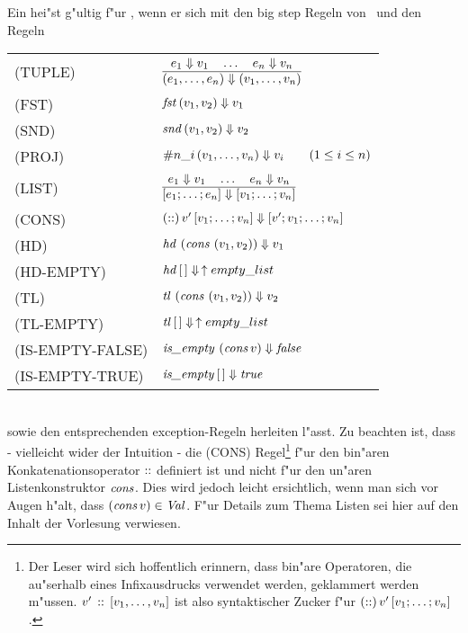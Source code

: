 Ein  hei"st g"ultig f"ur \LTHREE, wenn er sich mit den big step Regeln von \LTWO\ und den Regeln\\[5mm]
  \begin{tabular}{ll}
    \mbox{(TUPLE)}          & $\regel{e_1 \eval v_1 \quad \ldots \quad e_n \eval v_n}
                                     {(e_1,\ldots,e_n) \eval (v_1,\ldots,v_n)}$ \\[5mm]
    \mbox{(FST)}            & ${\text{\it fst\/}}\,(v_1,v_2) \Downarrow v_1$ \\[3mm]
    \mbox{(SND)}            & ${\text{\it snd\/}}\,(v_1,v_2) \Downarrow v_2$ \\[3mm]
    \mbox{(PROJ)}           & $\#n\_i\,(v_1,\ldots,v_n) \Downarrow v_i \qquad (1 \le i \le n)$ \\[3mm]
    \mbox{(LIST)}           & $\regel{e_1 \eval v_1 \quad \ldots \quad e_n \eval v_n}
                                     {[e_1;\ldots;e_n] \eval [v_1;\ldots;v_n]}$ \\[5mm]
    \mbox{(CONS)}           & $(\mathrel{::})\,v'\,[v_1;\ldots;v_n] \Downarrow [v';v_1;\ldots;v_n]$ \\[3mm]
    \mbox{(HD)}             & ${\text{\it hd\/}}\,\left({\text{\it cons\/}}\,\left(v_1,v_2\right)\right) \Downarrow v_1$ \\[3mm]
    \mbox{(HD-EMPTY)}       & ${\text{\it hd\/}}\,[\,] \Downarrow\,\uparrow empty\_list$ \\[3mm]
    \mbox{(TL)}             & ${\text{\it tl\/}}\,\left({\text{\it cons\/}}\,\left(v_1,v_2\right)\right) \Downarrow v_2$ \\[3mm]
    \mbox{(TL-EMPTY)}       & ${\text{\it tl\/}}\,[\,] \Downarrow\,\uparrow empty\_list$ \\[3mm]
    \mbox{(IS-EMPTY-FALSE)} & ${\text{\it is\_empty\/}}\,\left({\text{\it cons\/}}\,v\right) \Downarrow {\text{\it false\/}}$ \\[3mm]
    \mbox{(IS-EMPTY-TRUE)}  & ${\text{\it is\_empty\/}}\,[\,] \Downarrow {\text{\it true\/}}$
  \end{tabular}\\[7mm]
sowie den entsprechenden exception-Regeln herleiten l"asst. Zu beachten ist, dass - vielleicht wider der Intuition - die
(CONS) Regel\footnote{Der Leser wird sich hoffentlich erinnern, dass bin"are Operatoren, die au"serhalb eines Infixausdrucks
verwendet werden, geklammert werden m"ussen. $v'\,\mathrel{::}\,[v_1,\ldots,v_n]$ ist also syntaktischer Zucker f"ur
$(\mathrel{::})\,v'\,[v_1;\ldots;v_n]$.} f"ur den bin"aren Konkatenationsoperator $\mathrel{::}$ definiert ist und nicht f"ur den
un"aren Listenkonstruktor ${\text{\it cons\/}}$. Dies wird jedoch leicht ersichtlich, wenn man sich vor Augen h"alt, dass $({\text{\it cons\/}}\,v) \in {\text{\it Val\/}}$.
F"ur Details zum Thema Listen sei hier auf den Inhalt der Vorlesung verwiesen.


